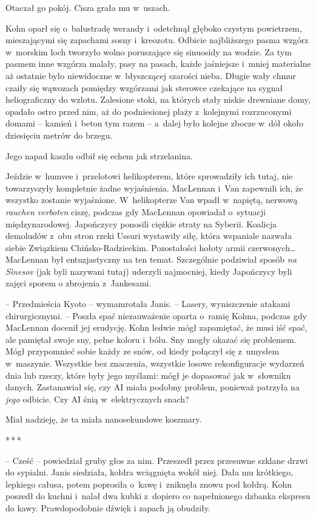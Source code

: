 \documentclass[oneside,polish,11pt,sfheadings]{mwbk}
\newcommand{\threeast}{\bigskip\par\centerline{*\,*\,*}\medskip\par}%
\begin{document}
Otaczał go pokój. Cisza grała mu w~uszach.

Kohn oparł się o~balustradę werandy i~odetchnął głęboko czystym
powietrzem, mieszającymi się zapachami sosny i~kreozotu. Odbicie
najbliższego pasma wzgórz w~morskim loch tworzyło wolno poruszające się
sinuosidy na wodzie. Za tym pasmem inne wzgórza malały, pasy na pasach,
każde jaśniejsze i~mniej materialne aż ostatnie było niewidoczne w~błyszczącej szarości nieba. Długie wały chmur czaiły się wąwozach
pomiędzy wzgórzami jak sterowce czekające na sygnał heliograficzny do
wzlotu. Zalesione stoki, na których stały niskie drewniane domy, opadało
ostro przed nim, aż do podniesionej plaży z~kolejnymi rozrzuconymi
domami -- kamień i~beton tym razem -- a~dalej było kolejne zbocze w~dół
około dziesięciu metrów do brzegu.

Jego napad kaszlu odbił się echem jak strzelanina.

Jeździe w~humvee i~przelotowi helikopterem, które sprowadziły ich tutaj,
nie towarzyszyły kompletnie żadne wyjaśnienia. MacLennan i~Van zapewnili
ich, że wszystko zostanie wyjaśnione. W~helikopterze Van wpadł w~napiętą, nerwową \emph{rauchen verboten} ciszę, podczas gdy MacLennan
opowiadał o~sytuacji międzynarodowej. Japończycy ponosili ciężkie straty
na Syberii. Koalicja demoludów z~obu stron rzeki Ussuri wystawiły siłę,
która wspaniale nazwała siebie Związkiem Chińsko-Radzieckim.
Pozostałości hołoty armii czerwonych\ldots MacLennan był entuzjastyczny na
ten temat. Szczególnie podziwiał sposób \emph{na Sìnesov} (jak byli
nazywani tutaj) uderzyli najmocniej, kiedy Japończycy byli zajęci sporem
o zbrojenia z~Jankesami.

-- Przedmieścia Kyoto -- wymamrotała Janis. -- Lasery, wyniszczenie atakami
chirurgicznymi. -- Poszła spać niezauważenie oparta o~ramię Kohna,
podczas gdy MacLennan docenił jej erudycję. Kohn ledwie mógł zapamiętać,
że musi iść spać, ale pamiętał swoje sny, pełne koloru i~bólu. Sny mogły
okazać się problemem. Mógł przypomnieć sobie każdy ze snów, od kiedy
połączył się z~umysłem w~maszynie. Wszystkie bez znaczenia, wszystkie
losowe rekonfiguracje wydarzeń dnia lub rzeczy, które były jego myślami:
mógł je dopasować jak w~słowniku danych. Zastanawiał się, czy AI miała
podobny problem, ponieważ patrzyła na \emph{jego} odbicie. Czy AI śnią w~elektrycznych snach?

Miał nadzieję, że ta miała nanosekundowe koszmary.

  \threeast 

-- Cześć -- powiedział gruby głos za nim. Przeszedł przez przesuwne
szklane drzwi do sypialni. Janis siedziała, kołdra wciągnięta wokół
niej. Dała mu krótkiego, lepkiego całusa, potem poprosiła o~kawę i~zniknęła znowu pod kołdrą. Kohn poszedł do kuchni i~nalał dwa kubki z~dopiero co napełnionego dzbanka ekspresu do kawy. Prawdopodobnie dźwięk
i zapach ją obudziły.
\end{document}
